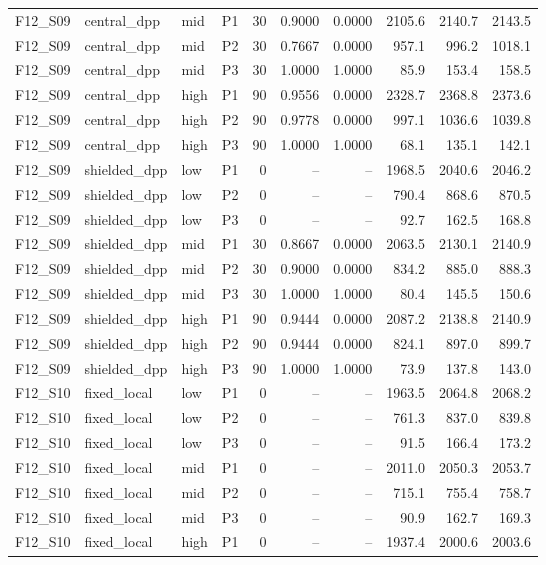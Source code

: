 \begin{longtable}{llllrrrrrr}
F12\_S09 & central\_dpp & mid & P1 & 30 & 0.9000 & 0.0000 & 2105.6 & 2140.7 & 2143.5 \\
F12\_S09 & central\_dpp & mid & P2 & 30 & 0.7667 & 0.0000 & 957.1 & 996.2 & 1018.1 \\
F12\_S09 & central\_dpp & mid & P3 & 30 & 1.0000 & 1.0000 & 85.9 & 153.4 & 158.5 \\
F12\_S09 & central\_dpp & high & P1 & 90 & 0.9556 & 0.0000 & 2328.7 & 2368.8 & 2373.6 \\
F12\_S09 & central\_dpp & high & P2 & 90 & 0.9778 & 0.0000 & 997.1 & 1036.6 & 1039.8 \\
F12\_S09 & central\_dpp & high & P3 & 90 & 1.0000 & 1.0000 & 68.1 & 135.1 & 142.1 \\
F12\_S09 & shielded\_dpp & low & P1 & 0 & -- & -- & 1968.5 & 2040.6 & 2046.2 \\
F12\_S09 & shielded\_dpp & low & P2 & 0 & -- & -- & 790.4 & 868.6 & 870.5 \\
F12\_S09 & shielded\_dpp & low & P3 & 0 & -- & -- & 92.7 & 162.5 & 168.8 \\
F12\_S09 & shielded\_dpp & mid & P1 & 30 & 0.8667 & 0.0000 & 2063.5 & 2130.1 & 2140.9 \\
F12\_S09 & shielded\_dpp & mid & P2 & 30 & 0.9000 & 0.0000 & 834.2 & 885.0 & 888.3 \\
F12\_S09 & shielded\_dpp & mid & P3 & 30 & 1.0000 & 1.0000 & 80.4 & 145.5 & 150.6 \\
F12\_S09 & shielded\_dpp & high & P1 & 90 & 0.9444 & 0.0000 & 2087.2 & 2138.8 & 2140.9 \\
F12\_S09 & shielded\_dpp & high & P2 & 90 & 0.9444 & 0.0000 & 824.1 & 897.0 & 899.7 \\
F12\_S09 & shielded\_dpp & high & P3 & 90 & 1.0000 & 1.0000 & 73.9 & 137.8 & 143.0 \\
F12\_S10 & fixed\_local & low & P1 & 0 & -- & -- & 1963.5 & 2064.8 & 2068.2 \\
F12\_S10 & fixed\_local & low & P2 & 0 & -- & -- & 761.3 & 837.0 & 839.8 \\
F12\_S10 & fixed\_local & low & P3 & 0 & -- & -- & 91.5 & 166.4 & 173.2 \\
F12\_S10 & fixed\_local & mid & P1 & 0 & -- & -- & 2011.0 & 2050.3 & 2053.7 \\
F12\_S10 & fixed\_local & mid & P2 & 0 & -- & -- & 715.1 & 755.4 & 758.7 \\
F12\_S10 & fixed\_local & mid & P3 & 0 & -- & -- & 90.9 & 162.7 & 169.3 \\
F12\_S10 & fixed\_local & high & P1 & 0 & -- & -- & 1937.4 & 2000.6 & 2003.6 \\

\end{longtable}
